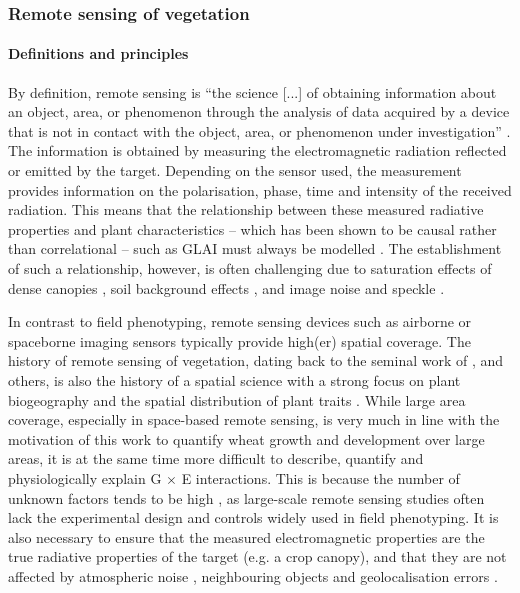\subsubsection{Remote sensing of vegetation}
\label{subsubsec:intor-rs-veg}
\paragraph{Definitions and principles}
By definition, remote sensing is ``the science [...] of obtaining information about an object, area, or phenomenon through the analysis of data acquired by a device that is not in contact with the object, area, or phenomenon under investigation'' \citep[p. 1]{lillesand_remote_2015}. The information is obtained by measuring the electromagnetic radiation reflected or emitted by the target. Depending on the sensor used, the measurement provides information on the polarisation, phase, time and intensity of the received radiation. This means that the relationship between these measured radiative properties and plant characteristics -- which \cite{kattenborn_radiative_2019} has been shown to be causal rather than correlational -- such as \gls{GLAI} must always be modelled \citep{weiss_remote_2020}. The establishment of such a relationship, however, is often challenging due to saturation effects of dense canopies \citep{mutanga_spectral_2023}, soil background effects \citep{qi_modified_1994}, and image noise and speckle \citep{boncelet_image_2009}.

In contrast to field phenotyping, remote sensing devices such as airborne or spaceborne imaging sensors typically provide high(er) spatial coverage. The history of remote sensing of vegetation, dating back to the seminal work of \cite{rouse_monitoring_1974}, \cite{aase_assessing_1981} and others, is also the history of a spatial science \citep{goodchild_geographical_1992} with a strong focus on plant biogeography and the spatial distribution of plant traits \citep{millington_gis_2001}. While large area coverage, especially in space-based remote sensing, is very much in line with the motivation of this work to quantify wheat growth and development over large areas, it is at the same time more difficult to describe, quantify and physiologically explain G $\times$ E interactions. This is because the number of unknown factors tends to be high \citep{helman_land_2018}, as large-scale remote sensing studies often lack the experimental design and controls widely used in field phenotyping. It is also necessary to ensure that the measured electromagnetic properties are the true radiative properties of the target (e.g. a crop canopy), and that they are not affected by atmospheric noise \citep{eklundh_noise_1995}, neighbouring objects \citep{wang_adaptive_2021} and geolocalisation errors \citep{yan_sentinel-2a_2018}.

